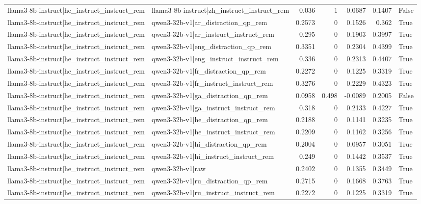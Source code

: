 \begin{table}
\begin{tabular}{l l r r r r l}
llama3-8b-instruct|he_instruct_instruct_rem & llama3-8b-instruct|zh_instruct_instruct_rem & 0.036 & 1 & -0.0687 & 0.1407 & False \\
llama3-8b-instruct|he_instruct_instruct_rem & qwen3-32b-v1|ar_distraction_qp_rem & 0.2573 & 0 & 0.1526 & 0.362 & True \\
llama3-8b-instruct|he_instruct_instruct_rem & qwen3-32b-v1|ar_instruct_instruct_rem & 0.295 & 0 & 0.1903 & 0.3997 & True \\
llama3-8b-instruct|he_instruct_instruct_rem & qwen3-32b-v1|eng_distraction_qp_rem & 0.3351 & 0 & 0.2304 & 0.4399 & True \\
llama3-8b-instruct|he_instruct_instruct_rem & qwen3-32b-v1|eng_instruct_instruct_rem & 0.336 & 0 & 0.2313 & 0.4407 & True \\
llama3-8b-instruct|he_instruct_instruct_rem & qwen3-32b-v1|fr_distraction_qp_rem & 0.2272 & 0 & 0.1225 & 0.3319 & True \\
llama3-8b-instruct|he_instruct_instruct_rem & qwen3-32b-v1|fr_instruct_instruct_rem & 0.3276 & 0 & 0.2229 & 0.4323 & True \\
llama3-8b-instruct|he_instruct_instruct_rem & qwen3-32b-v1|ga_distraction_qp_rem & 0.0958 & 0.498 & -0.0089 & 0.2005 & False \\
llama3-8b-instruct|he_instruct_instruct_rem & qwen3-32b-v1|ga_instruct_instruct_rem & 0.318 & 0 & 0.2133 & 0.4227 & True \\
llama3-8b-instruct|he_instruct_instruct_rem & qwen3-32b-v1|he_distraction_qp_rem & 0.2188 & 0 & 0.1141 & 0.3235 & True \\
llama3-8b-instruct|he_instruct_instruct_rem & qwen3-32b-v1|he_instruct_instruct_rem & 0.2209 & 0 & 0.1162 & 0.3256 & True \\
llama3-8b-instruct|he_instruct_instruct_rem & qwen3-32b-v1|hi_distraction_qp_rem & 0.2004 & 0 & 0.0957 & 0.3051 & True \\
llama3-8b-instruct|he_instruct_instruct_rem & qwen3-32b-v1|hi_instruct_instruct_rem & 0.249 & 0 & 0.1442 & 0.3537 & True \\
llama3-8b-instruct|he_instruct_instruct_rem & qwen3-32b-v1|raw & 0.2402 & 0 & 0.1355 & 0.3449 & True \\
llama3-8b-instruct|he_instruct_instruct_rem & qwen3-32b-v1|ru_distraction_qp_rem & 0.2715 & 0 & 0.1668 & 0.3763 & True \\
llama3-8b-instruct|he_instruct_instruct_rem & qwen3-32b-v1|ru_instruct_instruct_rem & 0.2272 & 0 & 0.1225 & 0.3319 & True \\

\end{tabular}
\end{table}
